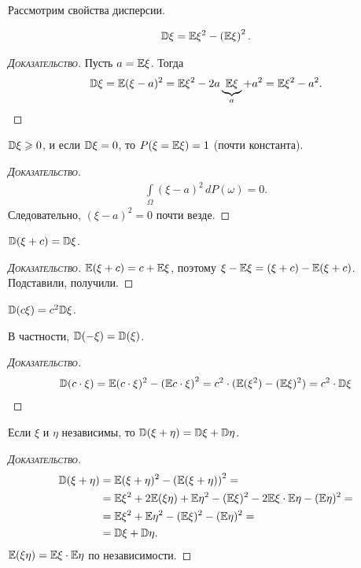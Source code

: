 \documentclass[../main.tex]{subfiles}
\begin{document}
Рассмотрим свойства дисперсии.
\begin{prop}
 \begin{align*}
  \mathbb D\xi = \mathbb E \xi^{2} - \left( \mathbb E \xi \right)^{2}.
 \end{align*} 

\end{prop}
\begin{proof}[\normalfont\textsc{Доказательство}]
 Пусть $a = \mathbb E\xi $. Тогда
 \begin{align*}
  \mathbb D\xi = \mathbb E(\xi - a)^{2} = \mathbb E\xi^{2} - 2a \underbrace{\mathbb E\xi}_{a} + a^{2} = \mathbb E\xi^{2} - a^{2}.
 \end{align*} 
\end{proof}

\begin{prop}
 $ \mathbb D\xi \geqslant 0 $, и если $ \mathbb D\xi = 0 $, то $ P(\xi = \mathbb E\xi) = 1 $ (почти константа).
\end{prop}
\begin{proof}[\normalfont\textsc{Доказательство}]
 \begin{align*}
  \int\limits_{\Omega} (\xi - a)^{2} \,dP(\omega) = 0.
 \end{align*} Следовательно, $ (\xi - a)^{2} = 0 $ почти везде.
\end{proof}

\begin{prop}
 $ \mathbb D(\xi + c) = \mathbb D\xi $.
\end{prop}
\begin{proof}[\normalfont\textsc{Доказательство}]
 $ \mathbb E(\xi + c) = c + \mathbb E\xi $, поэтому $ \xi - \mathbb E\xi = (\xi + c) - \mathbb E(\xi + c) $. Подставили, получили.
\end{proof}
\begin{prop}
 $ \mathbb D(c\xi) = c^{2}\mathbb D\xi $.

 В частности, $ \mathbb D(-\xi) = \mathbb D(\xi) $.
\end{prop}
\begin{proof}[\normalfont\textsc{Доказательство}]
  \begin{align*}
    \mathbb D(c \cdot \xi) = \mathbb E (c \cdot \xi)^{2} - \left( \mathbb E c \cdot \xi \right)^{2} = c^2 \cdot (\mathbb E(\xi^2) - (\mathbb E \xi)^2) = c^2 \cdot \mathbb D\xi
  \end{align*}
\end{proof}

\begin{prop}
 Если $ \xi  $ и $ \eta $ независимы, то $ \mathbb D(\xi + \eta) = \mathbb D\xi + \mathbb D\eta $.
\end{prop}
\begin{proof}[\normalfont\textsc{Доказательство}]
 \begin{align*}
  \mathbb D(\xi + \eta) &= \mathbb E(\xi + \eta)^{2} - \left( \mathbb E(\xi+\eta) \right)^{2} = \\
  &= \mathbb E\xi^{2} + 2\mathbb E(\xi\eta) + \mathbb E\eta^{2} -  (\mathbb E\xi)^{2} - 2\mathbb E\xi \cdot \mathbb E\eta - (\mathbb E\eta)^{2} = \\
  &=  \mathbb E\xi^{2} + \mathbb E\eta^{2} -  (\mathbb E\xi)^{2} - (\mathbb E\eta)^{2} = \\
  &=\mathbb D\xi+\mathbb D\eta.
 \end{align*} $ \mathbb E(\xi\eta) = \mathbb E\xi \cdot \mathbb E\eta $ по независимости.
\end{proof}
\end{document}

